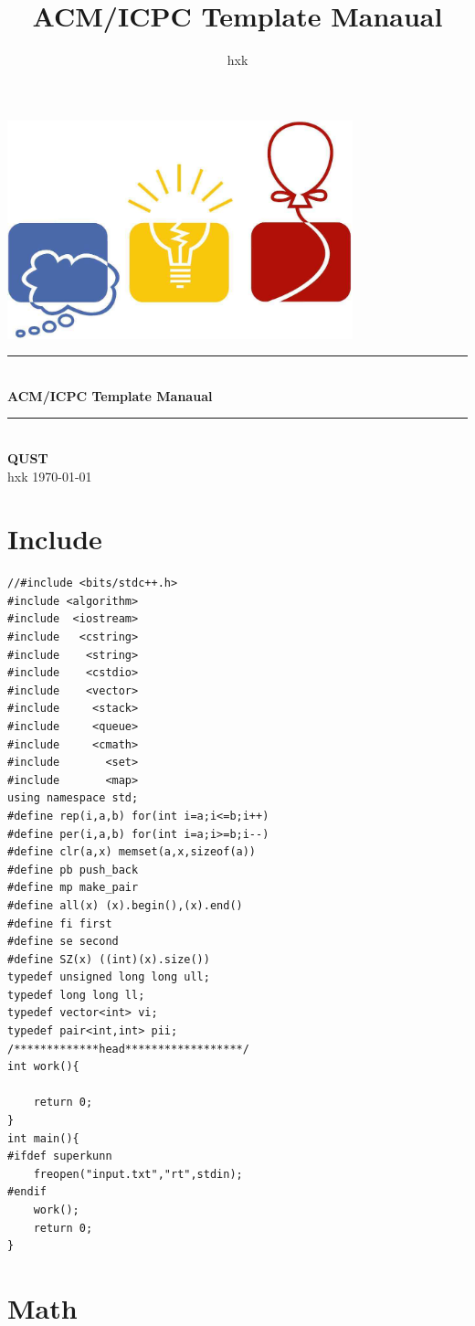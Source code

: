 \documentclass[twoside]{article}
\title{ACM/ICPC Template Manaual}
\author{hxk}
\newcommand{\HRule}{\rule{\linewidth}{0.5mm}}
\begin{document}
\small
\begin{titlepage}
\begin{center}
\vspace*{0.5cm}\includegraphics[width=0.75\textwidth]{logo.jpg} \\ [2cm]
\HRule \\ [1cm]
\textbf{\Huge{ACM/ICPC Template Manaual}} \\ [0.5cm]
\HRule \\ [4cm]
\textbf{\Huge{QUST}} \\ [1cm]
\LARGE{hxk}
\vfill
\Large{\today}
\end{center}
\clearpage
\end{titlepage}
\tableofcontents\clearpage
\pagestyle{fancy}
\lfoot{}
\cfoot{\thepage}\rfoot{}
\setcounter{section}{-1}
\setcounter{page}{1}
\clearpage\section{Include}
\begin{lstlisting}
//#include <bits/stdc++.h>
#include <algorithm>
#include  <iostream>
#include   <cstring>
#include    <string>
#include    <cstdio>
#include    <vector>
#include     <stack>
#include     <queue>
#include     <cmath>
#include       <set>
#include       <map>
using namespace std;
#define rep(i,a,b) for(int i=a;i<=b;i++)
#define per(i,a,b) for(int i=a;i>=b;i--)
#define clr(a,x) memset(a,x,sizeof(a))
#define pb push_back
#define mp make_pair
#define all(x) (x).begin(),(x).end()
#define fi first
#define se second
#define SZ(x) ((int)(x).size())
typedef unsigned long long ull;
typedef long long ll;
typedef vector<int> vi;
typedef pair<int,int> pii;
/*************head******************/
int work(){
    
    return 0;
}
int main(){
#ifdef superkunn
    freopen("input.txt","rt",stdin);
#endif
    work();
    return 0;
}
\end{lstlisting}
\clearpage\section{Math}
\end{document}
